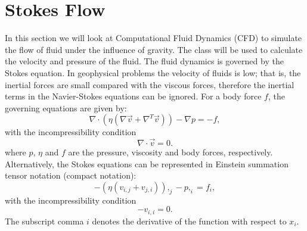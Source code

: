 
%
%
%

\section{Stokes Flow}
\label{STOKES FLOW CHAP}
In this section we will look at Computational Fluid Dynamics (CFD) to simulate
the flow of fluid under the influence of gravity.
The  class will be used to calculate the velocity
and pressure of the fluid.
The fluid dynamics is governed by the Stokes equation. In geophysical problems
the velocity of fluids is low; that is, the inertial forces are small compared
with the viscous forces, therefore the inertial terms in the Navier-Stokes
equations can be ignored.
For a body force $f$, the governing equations are given by:
%
\begin{equation}
\nabla \cdot (\eta(\nabla \vec{v} + \nabla^{T} \vec{v})) - \nabla p = -f,
\label{GENERAL NAVIER STOKES}
\end{equation}
%
with the incompressibility condition
%
\begin{equation}
\nabla \cdot \vec{v} = 0.
\label{INCOMPRESSIBILITY}
\end{equation}
%
where $p$, $\eta$ and $f$ are the pressure, viscosity and body forces, respectively.
Alternatively, the Stokes equations can be represented in Einstein summation
tensor notation (compact notation):
%
\begin{equation}
-(\eta(v_{i,j} + v_{j,i})),_{j} - p,_{i} = f_{i},
\label{GENERAL NAVIER STOKES COM}
\end{equation}
%
with the incompressibility condition
%
\begin{equation}
-v_{i,i} = 0.
\label{INCOMPRESSIBILITY COM}
\end{equation}
%
The subscript comma $i$ denotes the derivative of the function with respect to $x_{i}$.
